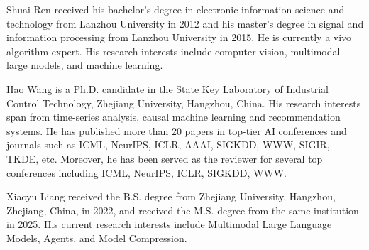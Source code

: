 \vspace{-3em}

\begin{IEEEbiography}{Shuai Ren}
received his bachelor's degree in electronic information science and technology from Lanzhou University in 2012 and his master's degree in signal and information processing from Lanzhou University in 2015. He is currently a vivo algorithm expert. His research interests include computer vision, multimodal large models, and machine learning.
\end{IEEEbiography}

\vspace{-3em}

\begin{IEEEbiography}{Hao Wang}
is a Ph.D. candidate in the State Key Laboratory of Industrial Control Technology, Zhejiang University, Hangzhou, China. 
His research interests span from time-series analysis, causal machine learning and recommendation systems.
He has published more than 20 papers in top-tier AI conferences and journals such as ICML, NeurIPS, ICLR, AAAI, SIGKDD, WWW, SIGIR, TKDE, etc.
Moreover, he has been served as the reviewer for several top conferences including ICML, NeurIPS, ICLR, SIGKDD, WWW.
\end{IEEEbiography}

\vspace{-3em}

\begin{IEEEbiography}{Xiaoyu Liang}
received the B.S. degree from Zhejiang University, Hangzhou, Zhejiang, China, in 2022, and received the M.S. degree from the same institution in 2025. His current research interests include Multimodal Large Language Models, Agents, and Model Compression.
\end{IEEEbiography}

